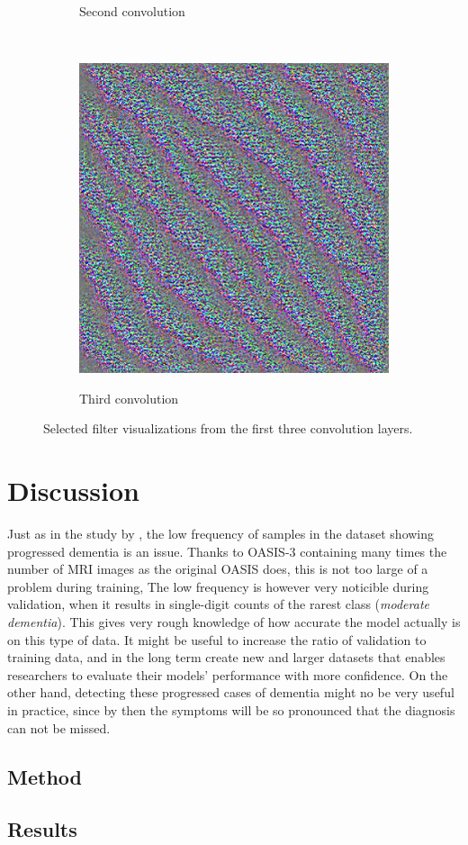 \documentclass{kththesis}
\begin{document}
\begin{figure}
\begin{subfigure}{.5\textwidth}
    \label{fig:layer1}
    \caption{Second convolution}
  \end{subfigure}
  \\[10pt]
  \begin{subfigure}{1\textwidth}
    \centering
    \includegraphics[width=0.45\linewidth]{img/layer2.png}
    \label{fig:layer2}
    \caption{Third convolution}
  \end{subfigure}
  \label{fig:filtervis}
  \caption{Selected filter visualizations from the first three convolution layers.}
\end{figure}

\chapter{Discussion}
Just as in the study by \textcite{islam2018early}, the low frequency of samples in the dataset showing progressed dementia is an issue. Thanks to OASIS-3 containing many times the number of MRI images as the original OASIS does, this is not too large of a problem during training, The low frequency is however very noticible during validation, when it results in single-digit counts of the rarest class (\textit{moderate dementia}). This gives very rough knowledge of how accurate the model actually is on this type of data. It might be useful to increase the ratio of validation to training data, and in the long term create new and larger datasets that enables researchers to evaluate their models' performance with more confidence. On the other hand, detecting these progressed cases of dementia might no be very useful in practice, since by then the symptoms will be so pronounced that the diagnosis can not be missed.

\section{Method}
\section{Results}
\end{document}

